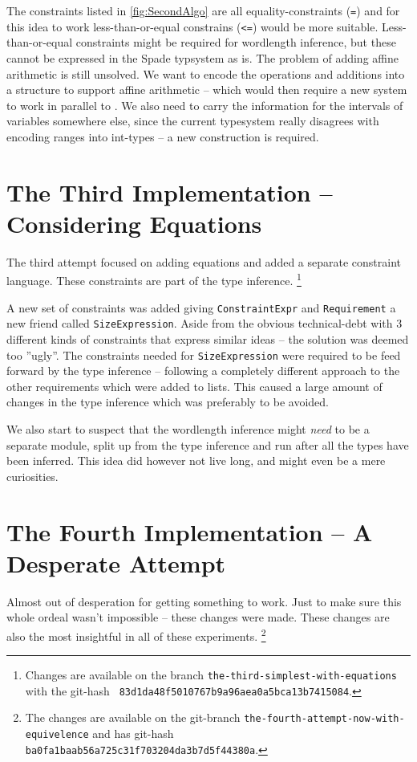 The constraints listed in \ref{fig:SecondAlgo} are all equality-constraints (\verb+=+) and for this idea to work less-than-or-equal constrains (\verb+<=+) would be more suitable. Less-than-or-equal constraints might be required for wordlength inference, but these cannot be expressed in the Spade typsystem as is. The problem of adding affine arithmetic is still unsolved. We want to encode the operations and additions into a structure to support affine arithmetic -- which would then require a new system to work in parallel to . We also need to carry the information for the intervals of variables somewhere else, since the current typesystem really disagrees with encoding ranges into int-types -- a new construction is required. 

\section{The Third Implementation -- Considering Equations}
\label{sec:Third}
The third attempt focused on adding equations and added a separate constraint language. These constraints are part of the type inference.
\cprotect\footnote{Changes are available on the branch \verb+the-third-simplest-with-equations+ with the git-hash \verb+ 83d1da48f5010767b9a96aea0a5bca13b7415084+.}

A new set of constraints was added giving \verb+ConstraintExpr+ and \verb+Requirement+ a new friend called \verb+SizeExpression+. Aside from the obvious technical-debt with 3 different kinds of constraints that express similar ideas -- the solution was deemed too ''ugly''. The constraints needed for \verb+SizeExpression+ were required to be feed forward by the type inference -- following a completely different approach to the other requirements which were added to lists. This caused a large amount of changes in the type inference which was preferably to be avoided.

We also start to suspect that the wordlength inference might \textit{need} to be a separate module, split up from the type inference and run after all the types have been inferred. This idea did however not live long, and might even be a mere curiosities.

\section{The Fourth Implementation -- A Desperate Attempt}
\label{sec:Forth}

Almost out of desperation for getting something to work. Just to make sure this whole ordeal wasn't impossible -- these changes were made. These changes are also the most insightful in all of these experiments.
\cprotect\footnote{The changes are available on the git-branch \verb+the-fourth-attempt-now-with-equivelence+ and has git-hash \verb+ba0fa1baab56a725c31f703204da3b7d5f44380a+.}

